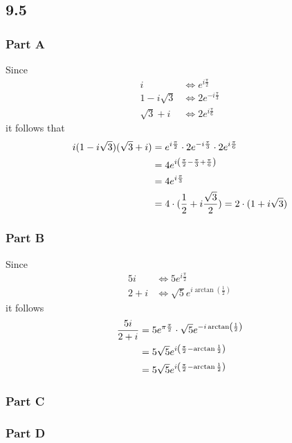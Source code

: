 \documentclass[12pt,titlepage]{extarticle}
\begin{document}
\subsection*{9.5}
\subsubsection*{Part A}
Since
\begin{align*}
    i &\Leftrightarrow e^{i\frac{\pi}{2}} \\
    1 - i\sqrt{3} &\Leftrightarrow 2e^{-i \frac{\pi}{3}} \\
    \sqrt{3} + i &\Leftrightarrow 2e^{i \frac{\pi}{6}}
\end{align*}
it follows that
\begin{align*}
    i (1 - i\sqrt{3})(\sqrt{3} + i) &= e^{i \frac{\pi}{2}} \cdot 2 e^{-i \frac{\pi}{3}} \cdot 2e^{i \frac{\pi}{6}} \\
    &= 4 e^{i\qty(\frac{\pi}{2} - \frac{\pi}{3} + \frac{\pi}{6})} \\
    &= 4e^{i \frac{\pi}{3}} \\
    &= 4 \cdot (\frac{1}{2} + i\frac{\sqrt{3}}{2}) = 2 \cdot (1 + i\sqrt{3})
\end{align*}

\subsubsection*{Part B}
Since
\begin{align*}
    5i &\Leftrightarrow 5 e^{i \frac{\pi}{2}} \\
    2 + i &\Leftrightarrow \sqrt{5} e^{i \arctan(\frac{1}{2})}
\end{align*}
it follows
\begin{align*}
    \frac{5i}{2+i} &= 5e^{\pi \frac{\pi}{2}} \cdot \sqrt{5} e^{-i \arctan(\frac{1}{2})} \\
                   &= 5 \sqrt{5} e^{i \qty(\frac{\pi}{2} - \arctan{\frac{1}{2}})} \\
                   &= 5 \sqrt{5} e^{i \qty(\frac{\pi}{2} - \arctan{\frac{1}{2}})}
\end{align*}

\subsubsection*{Part C}


\subsubsection*{Part D}
\end{document}
